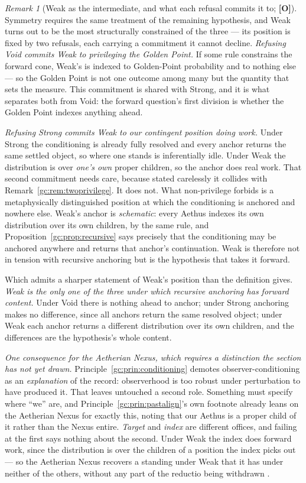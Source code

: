 \documentclass[11pt]{article}
\numberwithin{equation}{section}
\theoremstyle{plain}
\theoremstyle{definition}
\theoremstyle{remark}
\newtheorem{remark}[theorem]{Remark}
\begin{document}
\begin{remark}[Weak as the intermediate, and what each refusal commits
it to; \textbf{[O]}]\label{gc:rem:weakposition}
Symmetry requires the same treatment of the remaining hypothesis, and
Weak turns out to be the most structurally constrained of the three ---
its position is fixed by two refusals, each carrying a commitment it
cannot decline. \emph{Refusing Void commits Weak to privileging the Golden Point.} If
some rule constrains the forward cone, Weak's is indexed to
Golden-Point probability and to nothing else --- so the Golden Point is
not one outcome among many but the quantity that sets the measure. This
commitment is shared with Strong, and it is what separates both from
Void: the forward question's first division is whether the Golden Point
indexes anything ahead.

\emph{Refusing Strong commits Weak to our contingent position doing
work.} Under Strong the conditioning is already fully resolved and every
anchor returns the same settled object, so where one stands is
inferentially idle. Under Weak the distribution is over \emph{one's own}
proper children, so the anchor does real work. That second commitment needs care, because stated carelessly it collides
with Remark~\ref{gc:rem:twoprivilege}. It does not. What non-privilege
forbids is a metaphysically distinguished position at which the
conditioning is anchored and nowhere else. Weak's anchor is
\emph{schematic}: every Aethus indexes its own distribution over its own
children, by the same rule, and Proposition~\ref{gc:prop:recursive} says
precisely that the conditioning may be anchored anywhere and returns
that anchor's continuation. Weak is therefore not in tension with
recursive anchoring but is the hypothesis that takes it forward.

Which admits a sharper statement of Weak's position than the definition
gives. \emph{Weak is the only one of the three under which recursive
anchoring has forward content.} Under Void there is nothing ahead to
anchor; under Strong anchoring makes no difference, since all anchors
return the same resolved object; under Weak each anchor returns a
different distribution over its own children, and the differences are
the hypothesis's whole content.

\emph{One consequence for the Aetherian Nexus, which requires a
distinction the section has not yet drawn.}
Principle~\ref{gc:prin:conditioning} demotes observer-conditioning as an
\emph{explanation} of the record: observerhood is too robust under
perturbation to have produced it. That leaves untouched a second role.
Something must specify where ``we'' are, and
Principle~\ref{gc:prin:pastalign}'s own footnote already leans on the
Aetherian Nexus for exactly this, noting that our Aethus is a proper
child of it rather than the Nexus entire. \emph{Target} and \emph{index}
are different offices, and failing at the first says nothing about the
second. Under Weak the index does forward work, since the distribution
is over the children of a position the index picks out --- so the
Aetherian Nexus recovers a standing under Weak that it has under neither
of the others, without any part of the reductio being withdrawn
\cite{Nexus}.


\end{remark}
\end{document}
